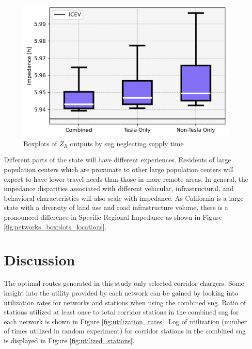 \begin{multicols}{2}
\begin{figure}[H]
	\centering
	\includegraphics[width = \linewidth]{figs/Networks_Boxplots_Impedance_Driving.png}
	\caption{Boxplots of $Z_R$ outputs by \gls{sng} neglecting supply time}
	\label{fig:networks_boxplots_driving}
\end{figure}

Different parts of the state will have different experiences. Residents of large population centers which are proximate to other large population centers will expect to have lower travel needs than those in more remote areas. In general, the impedance disparities associated with different vehicular, infrastructural, and behavioral characteristics will also scale with impedance. As California is a large state with a diversity of land use and road infrastructure volume, there is a pronounced difference in Specific Regional Impedance as shown in Figure \ref{fig:networks_boxplots_locations}.

%
%
%	
\section*{Discussion}

The optimal routes generated in this study only selected corridor chargers. Some insight into the utility provided by each network can be gained by looking into utilization rates for networks and stations when using the combined \gls{sng}. Ratio of stations utilized at least once to total corridor stations in the combined \gls{sng} for each network is shown in Figure \ref{fig:utilization_rates}. Log of utilization (number of times utilized in random experiment) for corridor stations in the combined \gls{sng} is displayed in Figure \ref{fig:utilized_stations}.


\end{multicols}

